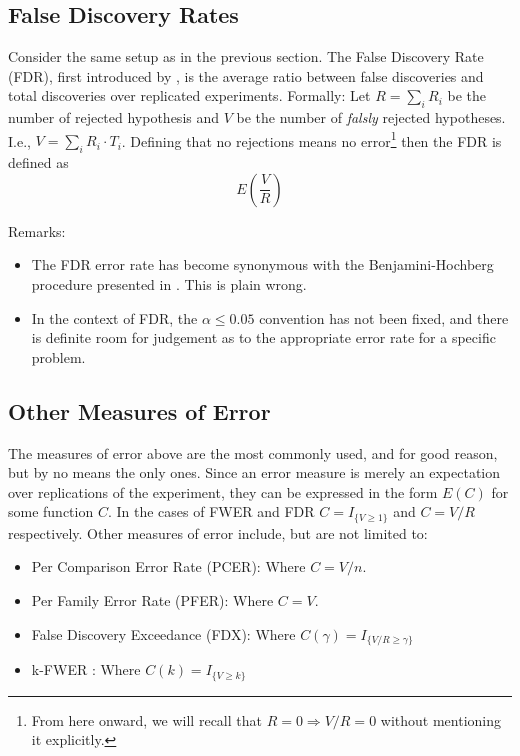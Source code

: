\documentclass[draft,12pt]{article}
\begin{document}
\subsection{False Discovery Rates}
Consider the same setup as in the previous section. The False Discovery Rate (FDR), first introduced by \citet{benjamini_controlling_1995}, is the average ratio between false discoveries and total discoveries over replicated experiments.
Formally: Let $R=\sum_i{R_i}$ be the number of rejected hypothesis and $V$ be the number of \emph{falsly} rejected hypotheses. I.e., $V=\sum_i{R_i \cdot T_i}$. Defining that no rejections means no error\footnote{ From here onward, we will recall that $R=0 \Rightarrow V/R=0$ without mentioning it explicitly.} then the FDR is defined as $$E \left( \frac{V}{R} \right)$$

Remarks:
\begin{itemize}
\item The FDR error rate has become synonymous with the Benjamini-Hochberg procedure presented in \citet{benjamini_controlling_1995} . This is plain wrong.
\item In the context of FDR, the $\alpha \leq 0.05$ convention has not been fixed, and there is definite room for judgement as to the appropriate error rate for a specific problem.
\end{itemize}




\subsection{Other Measures of Error}
The measures of error above are the most commonly used, and for good reason, but by no means the only ones. Since an error measure is merely an expectation over replications of the experiment, they can be expressed in the form $E(C)$ for some function $C$. In the cases of FWER and FDR $C = I_{\{ V \geq 1 \} } $ and $C = V/R$ respectively.
Other measures of error include, but are not limited to:

\begin{itemize}
\item Per Comparison Error Rate (PCER): Where $C=V/n$.
\item Per Family Error Rate (PFER): Where $C=V$.
\item False Discovery Exceedance (FDX)\citep{genovese_exceedance_2006}: Where $C(\gamma) = I_{\{ V/R \geq \gamma \} }$
\item k-FWER \citep{van_der_laan_augmentation_2004}: Where $C(k) = I_{\{ V \geq k \} }$
\end{itemize}
\end{document}
